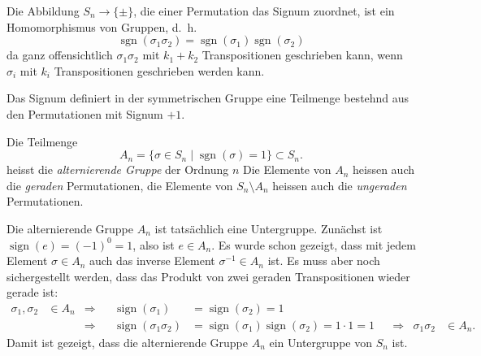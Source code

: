 Die Abbildung $S_n\to\{\pm\}$, die einer Permutation das Signum zuordnet,
ist ein Homomorphismus von Gruppen,
d.~h.
\[
\operatorname{sgn}(\sigma_1\sigma_2)
=
\operatorname{sgn}(\sigma_1)
\operatorname{sgn}(\sigma_2)
\]
da ganz offensichtlich $\sigma_1\sigma_2$ mit $k_1+k_2$ Transpositionen
geschrieben kann, wenn $\sigma_i$ mit $k_i$ Transpositionen geschrieben
werden kann.

Das Signum definiert in der symmetrischen Gruppe eine Teilmenge bestehnd
aus den Permutationen mit Signum $+1$.

\begin{definition}
Die Teilmenge
\[
A_n
=
\{
\sigma\in S_n\;|\; \operatorname{sgn}(\sigma)=1
\}
\subset S_n.
\]
heisst die {\em alternierende Gruppe} der Ordnung $n$
Die Elemente von $A_n$ heissen auch die {\em geraden} Permutationen,
die
Elemente von $S_n\setminus A_n$ heissen auch die {\em ungeraden}
Permutationen.
\end{definition}

Die alternierende Gruppe $A_n$ ist tatsächlich eine Untergruppe.
Zunächst ist $\operatorname{sign}(e)=(-1)^0=1$, also ist $e\in A_n$.
Es wurde schon gezeigt, dass mit jedem Element $\sigma\in A_n$ auch
das inverse Element $\sigma^{-1}\in A_n$ ist.
Es muss aber noch sichergestellt werden, dass das Produkt von zwei
geraden Transpositionen wieder gerade ist:
\[
\begin{aligned}
\sigma_1,\sigma_2&\in A_n
&\Rightarrow&&
\operatorname{sign}(\sigma_1)
&=
\operatorname{sign}(\sigma_2)
=
1
\\
&&\Rightarrow&&
\operatorname{sign}(\sigma_1\sigma_2)
&=
\operatorname{sign}(\sigma_1)
\operatorname{sign}(\sigma_2)
=
1\cdot 1=1
&&\Rightarrow&
\sigma_1\sigma_2&\in A_n.
\end{aligned}
\]
Damit ist gezeigt, dass die alternierende Gruppe $A_n$ ein Untergruppe von 
$S_n$ ist.

